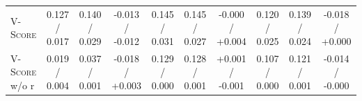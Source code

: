 \begin{table}[t]
\begin{tabular}{@{}l|ccc|ccc|ccc@{}}
        \textsc{V-Score}        & 0.127 / 0.017   & 0.140 / 0.029   & -0.013 / -0.012                     & 0.145 / 0.031   & 0.145 / 0.027   & -0.000 / +0.004                     & 0.120 / 0.025   & 0.139 / 0.024   & -0.018 / +0.000                     \\
        \textsc{V-Score} w/o r  & 0.019 / 0.004   & 0.037 / 0.001   & -0.018 / +0.003                     & 0.129 / 0.000   & 0.128 / 0.001   & +0.001 / -0.001                     & 0.107 / 0.000   & 0.121 / 0.001   & -0.014 / -0.000                     \\
        \bottomrule
    \end{tabular}
\end{table}